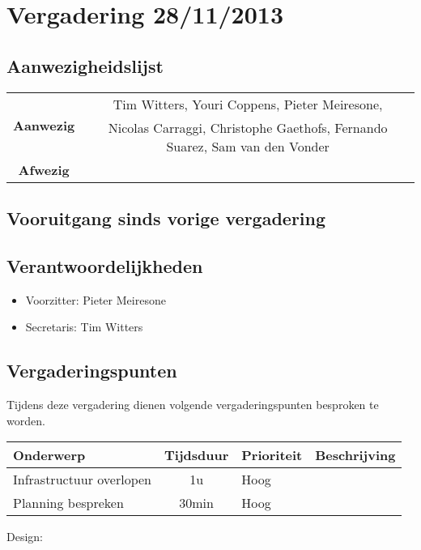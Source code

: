 \section{Vergadering 28/11/2013}
\subsection{Aanwezigheidslijst}
\begin{table}[htbp]
	\centering
	\begin{tabular}{c|c}
		\multirow{2}{*}{\textbf{Aanwezig}} & Tim Witters, Youri Coppens, Pieter Meiresone, \\
		& Nicolas Carraggi,  Christophe Gaethofs, Fernando Suarez, Sam van den Vonder \\
		\hline
		\textbf{Afwezig} & \\
	\end{tabular}
\end{table}

\subsection{Vooruitgang sinds vorige vergadering}


\subsection{Verantwoordelijkheden}
\begin{itemize}
	\item Voorzitter: Pieter Meiresone
	\item Secretaris: Tim Witters
\end{itemize}
\subsection{Vergaderingspunten}

Tijdens deze vergadering dienen volgende vergaderingspunten besproken te worden.
\begin{table} [H]
	\centering
	\begin{tabular} {l|cll}
		\textbf{Onderwerp} & \textbf{Tijdsduur} & \textbf{Prioriteit} & \textbf{Beschrijving} \\ %
		\hline
		Infrastructuur overlopen & 1u & Hoog & \\
		Planning bespreken & 30min & Hoog & \\
	\end{tabular}
\end{table}
Design:

